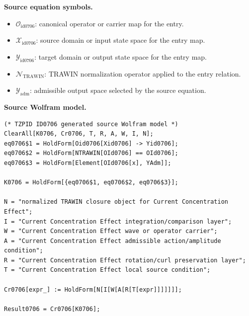 \begin{minipage}[t]{0.49\linewidth}
\begingroup
\small
\raggedright
\textbf{Source equation symbols.}\par
\begin{itemize}[leftmargin=1.35em,itemsep=1pt,topsep=1pt,parsep=0pt]
    \item $\mathcal{O}_{\mathrm{id0706}}$: canonical operator or carrier map for the entry.
    \item $\mathcal{X}_{\mathrm{id0706}}$: source domain or input state space for the entry map.
    \item $\mathcal{Y}_{\mathrm{id0706}}$: target domain or output state space for the entry map.
    \item $\mathcal{N}_{\mathrm{TRAWIN}}$: TRAWIN normalization operator applied to the entry relation.
    \item $\mathcal{Y}_{\mathrm{adm}}$: admissible output space selected by the source equation.
\end{itemize}
\endgroup
\end{minipage}\hfill
\begin{minipage}[t]{0.47\linewidth}
\begingroup
\scriptsize
\raggedright
\textbf{Source Wolfram model.}\par
\begin{Verbatim}[fontsize=\tiny,breaklines=true,breakanywhere=true]
(* TZPID ID0706 generated source Wolfram model *)
ClearAll[K0706, Cr0706, T, R, A, W, I, N];
eq0706$1 = HoldForm[Oid0706[Xid0706] -> Yid0706];
eq0706$2 = HoldForm[NTRAWIN[OId0706] == OId0706];
eq0706$3 = HoldForm[Element[OId0706[x], YAdm]];

K0706 = HoldForm[{eq0706$1, eq0706$2, eq0706$3}];

N = "normalized TRAWIN closure object for Current Concentration Effect";
I = "Current Concentration Effect integration/comparison layer";
W = "Current Concentration Effect wave or operator carrier";
A = "Current Concentration Effect admissible action/amplitude condition";
R = "Current Concentration Effect rotation/curl preservation layer";
T = "Current Concentration Effect local source condition";

Cr0706[expr_] := HoldForm[N[I[W[A[R[T[expr]]]]]]];

Result0706 = Cr0706[K0706];
\end{Verbatim}
\endgroup
\end{minipage}

